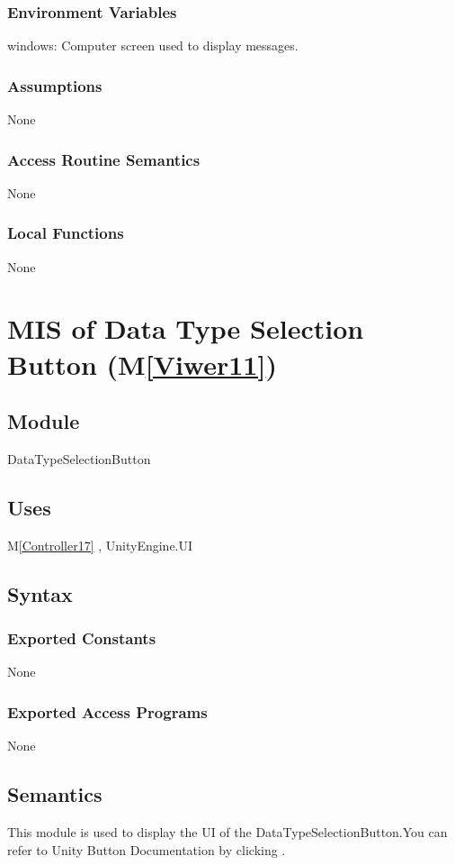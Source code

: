 \documentclass[12pt, titlepage]{article}
\newcommand{\mref}[1]{M\ref{#1}}
\begin{document}
\subsubsection{Environment Variables}
windows: Computer screen used to display messages.
\subsubsection{Assumptions}
None
\subsubsection{Access Routine Semantics}
None
\subsubsection{Local Functions}
None

\newpage

\section{MIS of Data Type Selection Button (\mref{Viwer11})}

\subsection{Module}
DataTypeSelectionButton

\subsection{Uses}
\mref{Controller17}  , UnityEngine.UI

\subsection{Syntax}
\subsubsection{Exported Constants}
None
\subsubsection{Exported Access Programs}
None

\subsection{Semantics}
This module is used to display the UI of the DataTypeSelectionButton.You can refer to Unity Button Documentation by clicking \bref.
\end{document}

